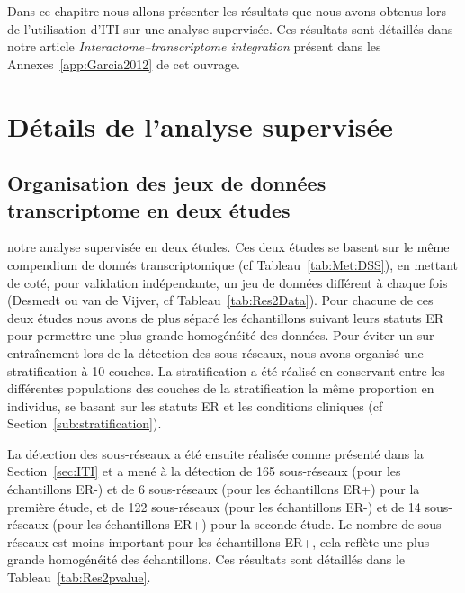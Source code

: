 \singlespacing

\label{chap:results2}
		\begin{center}
			\begin{tcolorbox}[colback=green!5!white,colframe=green!45!black,arc=0mm]
				\sffamily
				Dans ce chapitre nous allons présenter les résultats que nous avons obtenus lors de l'utilisation d'ITI sur une analyse supervisée.
				Ces résultats sont détaillés dans notre article \emph{Interactome–transcriptome integration} \citet{Garcia2012} présent dans les Annexes~\ref{app:Garcia2012} de cet ouvrage.
			\end{tcolorbox}
			\vspace{5ex}
			\minitoc
		\end{center}
		\newpage

\doublespacing

	\section{\textcolor{green!45!black}{Détails de l'analyse supervisée}}
		\subsection{\textcolor{green!45!black}{Organisation des jeux de données transcriptome en deux études}}
		 notre analyse supervisée en deux études.
		Ces deux études se basent sur le même compendium de donnés transcriptomique (cf Tableau~\ref{tab:Met:DSS}), en mettant de coté, pour validation indépendante, un jeu de données différent à chaque fois (Desmedt ou van de Vijver, cf Tableau~\ref{tab:Res2Data}).
		Pour chacune de ces deux études nous avons de plus séparé les échantillons suivant leurs statuts \acs{ER} pour permettre une plus grande homogénéité des données.
		Pour éviter un sur-entraînement lors de la détection des sous-réseaux, nous avons organisé une stratification à 10 couches.
		La stratification a été réalisé en conservant entre les différentes populations des couches de la stratification la même proportion en individus, se basant sur les statuts \acs{ER} et les conditions cliniques (cf Section~\ref{sub:stratification}).

		La détection des sous-réseaux a été ensuite réalisée comme présenté dans la Section~\ref{sec:ITI} et a mené à la détection de 165 sous-réseaux (pour les échantillons ER-) et de 6 sous-réseaux (pour les échantillons ER+) pour la première étude, et de 122 sous-réseaux (pour les échantillons ER-) et de 14 sous-réseaux (pour les échantillons ER+) pour la seconde étude.
		Le nombre de sous-réseaux est moins important pour les échantillons ER+, cela reflète une plus grande homogénéité des échantillons.
		Ces résultats sont détaillés dans le Tableau~\ref{tab:Res2pvalue}.

